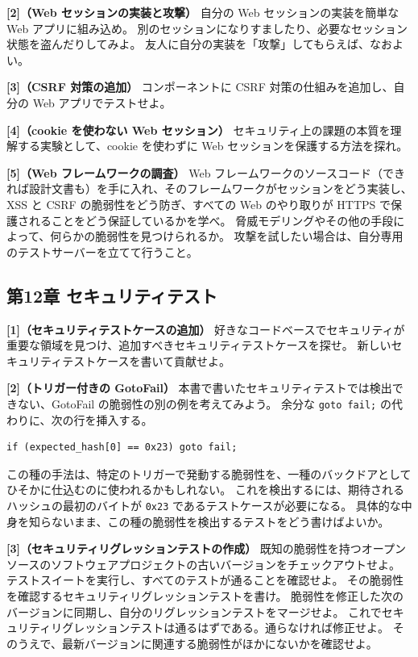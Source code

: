 \documentclass[uplatex]{jsarticle}
\begin{document}
\noindent\textbf{[2]（Web セッションの実装と攻撃）}\quad
自分の Web セッションの実装を簡単な Web アプリに組み込め。
別のセッションになりすましたり、必要なセッション状態を盗んだりしてみよ。
友人に自分の実装を「攻撃」してもらえば、なおよい。

\noindent\textbf{[3]（CSRF 対策の追加）}\quad
コンポーネントに CSRF 対策の仕組みを追加し、自分の Web アプリでテストせよ。

\noindent\textbf{[4]（cookie を使わない Web セッション）}\quad
セキュリティ上の課題の本質を理解する実験として、cookie を使わずに Web セッションを保護する方法を探れ。

\noindent\textbf{[5]（Web フレームワークの調査）}\quad
Web フレームワークのソースコード（できれば設計文書も）を手に入れ、そのフレームワークがセッションをどう実装し、XSS と CSRF の脆弱性をどう防ぎ、すべての Web のやり取りが HTTPS で保護されることをどう保証しているかを学べ。
脅威モデリングやその他の手段によって、何らかの脆弱性を見つけられるか。
攻撃を試したい場合は、自分専用のテストサーバーを立てて行うこと。

\subsection{第12章 セキュリティテスト}

\noindent\textbf{[1]（セキュリティテストケースの追加）}\quad
好きなコードベースでセキュリティが重要な領域を見つけ、追加すべきセキュリティテストケースを探せ。
新しいセキュリティテストケースを書いて貢献せよ。

\noindent\textbf{[2]（トリガー付きの GotoFail）}\quad
本書で書いたセキュリティテストでは検出できない、GotoFail の脆弱性の別の例を考えてみよう。
余分な \texttt{goto fail;} の代わりに、次の行を挿入する。
\begin{verbatim}
if (expected_hash[0] == 0x23) goto fail;
\end{verbatim}
この種の手法は、特定のトリガーで発動する脆弱性を、一種のバックドアとしてひそかに仕込むのに使われるかもしれない。
これを検出するには、期待されるハッシュの最初のバイトが \texttt{0x23} であるテストケースが必要になる。
具体的な中身を知らないまま、この種の脆弱性を検出するテストをどう書けばよいか。

\noindent\textbf{[3]（セキュリティリグレッションテストの作成）}\quad
既知の脆弱性を持つオープンソースのソフトウェアプロジェクトの古いバージョンをチェックアウトせよ。
テストスイートを実行し、すべてのテストが通ることを確認せよ。
その脆弱性を確認するセキュリティリグレッションテストを書け。
脆弱性を修正した次のバージョンに同期し、自分のリグレッションテストをマージせよ。
これでセキュリティリグレッションテストは通るはずである。通らなければ修正せよ。
そのうえで、最新バージョンに関連する脆弱性がほかにないかを確認せよ。
\end{document}
